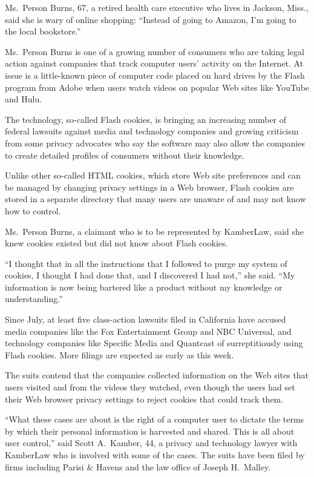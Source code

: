 ﻿\documentclass[12pt]{article}
\begin{document}
Ms.~Person Burns, 67, a retired health care executive who lives in Jackson, Miss., said she is wary
of online shopping: ``Instead of going to Amazon, I'm going to the local bookstore.''

Ms.~Person Burns is one of a growing number of consumers who are taking legal action against
companies that track computer users' activity on the Internet. At issue is a little-known piece of
computer code placed on hard drives by the Flash program from Adobe when users watch videos on
popular Web sites like YouTube and Hulu.

The technology, so-called Flash cookies, is bringing an increasing number of federal lawsuits
against media and technology companies and growing criticism from some privacy advocates who say the
software may also allow the companies to create detailed profiles of consumers without their
knowledge.

Unlike other so-called HTML cookies, which store Web site preferences and can be managed by changing
privacy settings in a Web browser, Flash cookies are stored in a separate directory that many users
are unaware of and may not know how to control.

Ms.~Person Burns, a claimant who is to be represented by KamberLaw, said she knew cookies existed
but did not know about Flash cookies.

``I thought that in all the instructions that I followed to purge my system of cookies, I thought I
had done that, and I discovered I had not,'' she said. ``My information is now being bartered like a
product without my knowledge or understanding.''

Since July, at least five class-action lawsuits filed in California have accused media companies
like the Fox Entertainment Group and NBC Universal, and technology companies like Specific Media and
Quantcast of surreptitiously using Flash cookies. More filings are expected as early as this week.

The suits contend that the companies collected information on the Web sites that users visited and
from the videos they watched, even though the users had set their Web browser privacy settings to
reject cookies that could track them.

``What these cases are about is the right of a computer user to dictate the terms by which their
personal information is harvested and shared. This is all about user control,'' said Scott
A.~Kamber, 44, a privacy and technology lawyer with KamberLaw who is involved with some of the
cases. The suits have been filed by firms including Parisi \& Havens and the law office of Joseph
H.~Malley.
\end{document}
